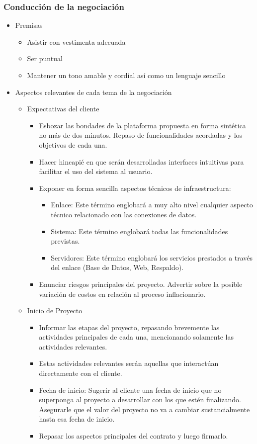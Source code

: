 \subsubsection{Conducción de la negociación}
\begin{itemize}
	\item Premisas
		\begin{itemize}
			\item Asistir con vestimenta adecuada
			\item Ser puntual
			\item Mantener un tono amable y cordial así como un lenguaje sencillo
		\end{itemize}
    
	\item Aspectos relevantes de cada tema de la negociación
    \begin{itemize}
		\item Expectativas del cliente
		\begin{itemize} 
			\item Esbozar las bondades de la plataforma propuesta en forma sintética no más de dos minutos. Repaso de funcionalidades acordadas y los objetivos de cada una.
			\item Hacer hincapié en que serán desarrolladas interfaces intuitivas para facilitar el uso del sistema al usuario.
			\item Exponer en forma sencilla aspectos técnicos de infraestructura:
			\begin{itemize}
				\item Enlace: Este término englobará a muy alto nivel cualquier aspecto técnico relacionado con las conexiones de datos.
				\item Sistema: Este término englobará todas las funcionalidades previstas.
				\item Servidores: Este término englobará los servicios prestados a través del enlace (Base de Datos, Web, Respaldo).
			\end{itemize}
            \item Enunciar riesgos principales del proyecto. Advertir sobre la posible variación de costos en relación al proceso inflacionario.
		\end{itemize}
        
		\item Inicio de Proyecto
        
	    \begin{itemize}
			\item Informar las etapas del proyecto, repasando brevemente las actividades principales de cada una, mencionando solamente las actividades relevantes.
			\item Estas actividades relevantes serán aquellas que interactúan directamente con el cliente.
			\item Fecha de inicio: Sugerir al cliente una fecha de inicio que no superponga al proyecto a desarrollar con los que estén finalizando. Asegurarle que el valor del proyecto no va a cambiar sustancialmente hasta esa fecha de inicio.
			\item Repasar los aspectos principales del contrato y luego firmarlo.
        \end{itemize}
        

\end{itemize}
\end{itemize}

